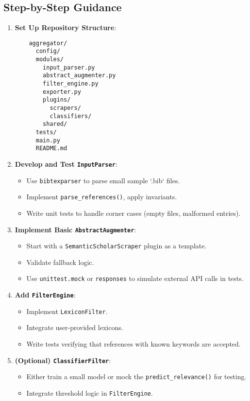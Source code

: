 \documentclass[12pt]{article}
\begin{document}
\subsection{Step-by-Step Guidance}
\begin{enumerate}
  \item \textbf{Set Up Repository Structure}:
  \begin{verbatim}
    aggregator/
      config/
      modules/
        input_parser.py
        abstract_augmenter.py
        filter_engine.py
        exporter.py
        plugins/
          scrapers/
          classifiers/
        shared/
      tests/
      main.py
      README.md
  \end{verbatim}

  \item \textbf{Develop and Test \texttt{InputParser}}:
    \begin{itemize}
      \item Use \texttt{bibtexparser} to parse small sample `.bib` files.
      \item Implement \texttt{parse\_references()}, apply invariants.
      \item Write unit tests to handle corner cases (empty files, malformed entries).
    \end{itemize}

  \item \textbf{Implement Basic \texttt{AbstractAugmenter}}:
    \begin{itemize}
      \item Start with a \texttt{SemanticScholarScraper} plugin as a template.
      \item Validate fallback logic. 
      \item Use \texttt{unittest.mock} or \texttt{responses} to simulate external API calls in tests.
    \end{itemize}

  \item \textbf{Add \texttt{FilterEngine}}:
    \begin{itemize}
      \item Implement \texttt{LexiconFilter}.
      \item Integrate user-provided lexicons. 
      \item Write tests verifying that references with known keywords are accepted.
    \end{itemize}

  \item \textbf{(Optional) \texttt{ClassifierFilter}}:
    \begin{itemize}
      \item Either train a small model or mock the \texttt{predict\_relevance()} for testing.
      \item Integrate threshold logic in \texttt{FilterEngine}.
    \end{itemize}


\end{enumerate}
\end{document}
